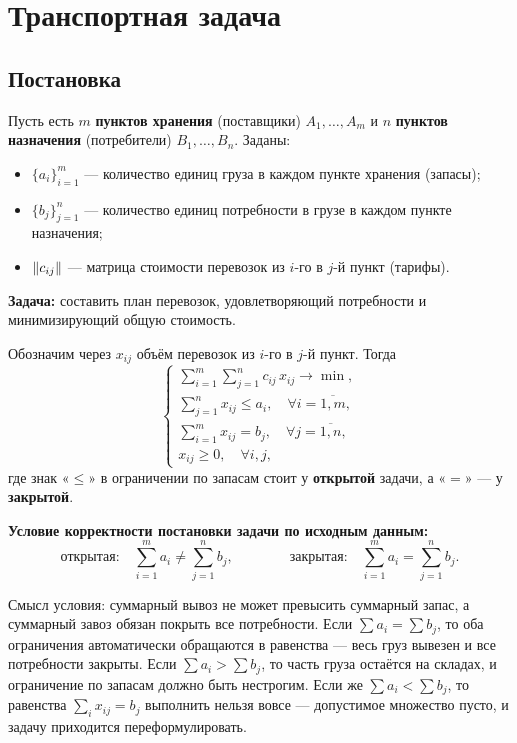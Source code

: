 
\section{Транспортная задача}

\subsection{Постановка}

Пусть есть $m$ \textbf{пунктов хранения} (поставщики) $A_1, \dots, A_m$ и $n$
\textbf{пунктов назначения} (потребители) $B_1, \dots, B_n$. Заданы:
\begin{itemize}[nosep,left=0pt]
  \item $\{a_i\}_{i=1}^{m}$ — количество единиц груза в каждом пункте хранения
        (запасы);
  \item $\{b_j\}_{j=1}^{n}$ — количество единиц потребности в грузе в каждом
        пункте назначения;
  \item $\left\lVert c_{ij} \right\rVert$ — матрица стоимости перевозок из $i$-го в $j$-й пункт
        (тарифы).
\end{itemize}

\medskip
\noindent\textbf{Задача:} составить план перевозок, удовлетворяющий потребности и
минимизирующий общую стоимость.

\medskip
Обозначим через $x_{ij}$ объём перевозок из $i$-го в $j$-й пункт. Тогда
\[
  \begin{cases}
    \displaystyle\sum_{i=1}^{m} \sum_{j=1}^{n} c_{ij}\, x_{ij} \to \min, \\[12pt]
    \displaystyle\sum_{j=1}^{n} x_{ij} \le a_i, \quad \forall i = \overline{1,m}, \\[12pt]
    \displaystyle\sum_{i=1}^{m} x_{ij} = b_j, \quad \forall j = \overline{1,n}, \\[10pt]
    x_{ij} \ge 0, \quad \forall i, j ,
  \end{cases}
\]
где знак «$\le$» в ограничении по запасам стоит у \textbf{открытой} задачи,
а «$=$» — у \textbf{закрытой}.


\medskip
\noindent\textbf{Условие корректности постановки задачи по исходным данным:}
\[
  \text{открытая:} \quad \sum_{i=1}^{m} a_i \ne \sum_{j=1}^{n} b_j ,
  \qquad\qquad
  \text{закрытая:} \quad \sum_{i=1}^{m} a_i = \sum_{j=1}^{n} b_j .
\]

\begin{idea}
Смысл условия: суммарный вывоз не может превысить суммарный запас, а суммарный
завоз обязан покрыть все потребности. Если $\sum a_i = \sum b_j$, то оба
ограничения автоматически обращаются в равенства — весь груз вывезен и все
потребности закрыты. Если $\sum a_i > \sum b_j$, то часть груза остаётся на
складах, и ограничение по запасам должно быть нестрогим. Если же
$\sum a_i < \sum b_j$, то равенства $\sum_i x_{ij} = b_j$ выполнить нельзя
вовсе — допустимое множество пусто, и задачу приходится переформулировать.
\end{idea}


